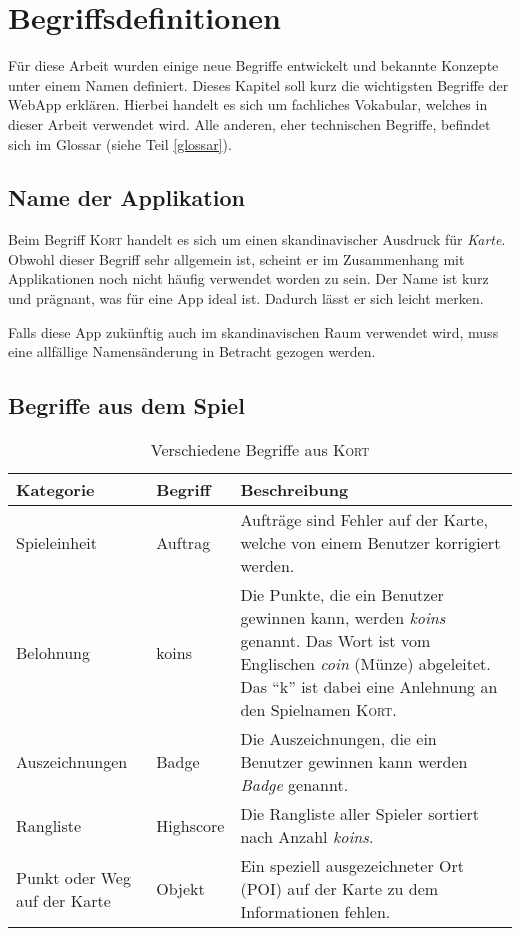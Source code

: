 \chapter{Begriffsdefinitionen}
\label{kort-definitionen}

Für diese Arbeit wurden einige neue Begriffe entwickelt und bekannte Konzepte unter einem Namen definiert.
Dieses Kapitel soll kurz die wichtigsten Begriffe der \gls{WebApp} erklären.
Hierbei handelt es sich um fachliches Vokabular, welches in dieser Arbeit verwendet wird.
Alle anderen, eher technischen Begriffe, befindet sich im Glossar (siehe Teil \ref{glossar}).

\section{Name der Applikation}
Beim Begriff \textsc{Kort} handelt es sich um einen skandinavischer Ausdruck für \emph{Karte}.
Obwohl dieser Begriff sehr allgemein ist, scheint er im Zusammenhang mit Applikationen noch nicht häufig verwendet worden zu sein.
Der Name ist kurz und prägnant, was für eine App ideal ist.
Dadurch lässt er sich leicht merken.

Falls diese App zukünftig auch im skandinavischen Raum verwendet wird, muss eine allfällige Namensänderung in Betracht gezogen werden.

\section{Begriffe aus dem Spiel}

\begin{table}[H]
\centering
\begin{tabular}{|p{0.2\threecelltabwidth}|p{0.2\threecelltabwidth}|p{0.6\threecelltabwidth}|}
\hline 
\small{\textbf{Kategorie}} & \small{\textbf{Begriff}} & \small{\textbf{Beschreibung}} \\
\hline 
Spieleinheit & Auftrag & Aufträge sind Fehler auf der Karte, welche von einem Benutzer korrigiert werden. \\
\hline 
Belohnung & koins & Die Punkte, die ein Benutzer gewinnen kann, werden \emph{koins} genannt.
Das Wort ist vom Englischen \emph{coin} (Münze) abgeleitet. 
Das "`k"' ist dabei eine Anlehnung an den Spielnamen \textsc{Kort}. \\
\hline 
Auszeichnungen & Badge & Die Auszeichnungen, die ein Benutzer gewinnen kann werden \emph{Badge} genannt. \\
\hline 
Rangliste & Highscore & Die Rangliste aller Spieler sortiert nach Anzahl \emph{koins}. \\
\hline 
Punkt oder Weg auf der Karte & Objekt & Ein speziell ausgezeichneter Ort (\gls{POI}) auf der Karte zu dem Informationen fehlen. \\
\hline 
\end{tabular}
\caption{Verschiedene Begriffe aus \textsc{Kort}}
\label{table-definitionen}
\end{table}

